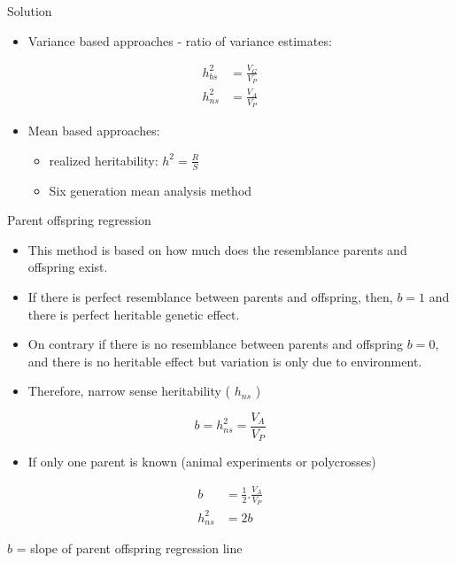 \documentclass[11pt,dvipsnames,ignorenonframetext,aspectratio=169]{beamer}
\providecommand{\tightlist}{%
  \setlength{\itemsep}{0pt}\setlength{\parskip}{0pt}}
\begin{document}
\begin{frame}{Solution}
\protect\hypertarget{solution-1}{}

\begin{itemize}
\tightlist
\item
  Variance based approaches - ratio of variance estimates:
\end{itemize}

\[
\begin{aligned}
h_{bs}^2 &= \frac{V_G}{V_P} \\ 
h_{ns}^2 &= \frac{V_A}{V_P}
\end{aligned}
\]

\begin{itemize}
\tightlist
\item
  Mean based approaches:

  \begin{itemize}
  \tightlist
  \item
    realized heritability: \(h^2 = \frac{R}{S}\)
  \item
    Six generation mean analysis method
  \end{itemize}
\end{itemize}

\end{frame}

\begin{frame}{Parent offspring regression}
\protect\hypertarget{parent-offspring-regression}{}

\begin{itemize}
\item
  This method is based on how much does the resemblance parents and
  offspring exist.
\item
  If there is perfect resemblance between parents and offspring, then,
  \(b = 1\) and there is perfect heritable genetic effect.
\item
  On contrary if there is no resemblance between parents and offspring
  \(b = 0\), and there is no heritable effect but variation is only due
  to environment.
\item
  Therefore, narrow sense heritability ( \(h_{ns}\) )
\end{itemize}

\[b= h_{ns}^2 = \frac{V_A}{V_P}\]

\end{frame}

\begin{frame}{}
\protect\hypertarget{section-14}{}

\begin{itemize}
\tightlist
\item
  If only one parent is known (animal experiments or polycrosses)
\end{itemize}

\[
\begin{aligned} 
b &= \frac{1}{2}.\frac{V_A}{V_P} \\ 
h_{ns}^2 &= 2b 
\end{aligned}
\]

\(b\) = slope of parent offspring regression line

\end{frame}
\end{document}
